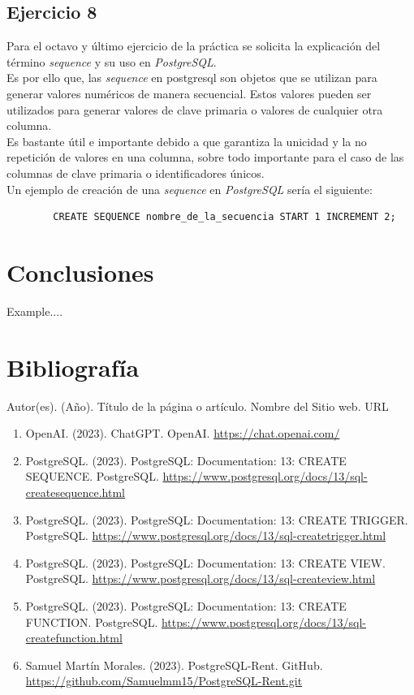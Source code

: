 \documentclass{report}
\begin{document}
	\section{Ejercicio 8}
	Para el octavo y último ejercicio de la práctica se solicita la explicación del término \emph{sequence} y su uso en \emph{PostgreSQL}.\\

	Es por ello que, las \emph{sequence} en postgresql son objetos que se utilizan para generar valores numéricos de manera secuencial. Estos valores pueden ser utilizados para generar valores de clave primaria o valores de cualquier otra columna.\\

	Es bastante útil e importante debido a que garantiza la unicidad y la no repetición de valores en una columna, sobre todo importante para el caso de las columnas de clave primaria o identificadores únicos.\\

	Un ejemplo de creación de una \emph{sequence} en \emph{PostgreSQL} sería el siguiente:

	\begin{verbatim}
		CREATE SEQUENCE nombre_de_la_secuencia START 1 INCREMENT 2;
	\end{verbatim}

	\chapter{Conclusiones}
  Example....	

	\chapter{Bibliografía}
	Autor(es). (Año). Título de la página o artículo. Nombre del Sitio web. URL\\
	\begin{enumerate}
		\item OpenAI. (2023). ChatGPT. OpenAI. \url{https://chat.openai.com/}
		\item PostgreSQL. (2023). PostgreSQL: Documentation: 13: CREATE SEQUENCE. PostgreSQL. \url{https://www.postgresql.org/docs/13/sql-createsequence.html}
		\item PostgreSQL. (2023). PostgreSQL: Documentation: 13: CREATE TRIGGER. PostgreSQL. \url{https://www.postgresql.org/docs/13/sql-createtrigger.html}
		\item PostgreSQL. (2023). PostgreSQL: Documentation: 13: CREATE VIEW. PostgreSQL. \url{https://www.postgresql.org/docs/13/sql-createview.html}
		\item PostgreSQL. (2023). PostgreSQL: Documentation: 13: CREATE FUNCTION. PostgreSQL. \url{https://www.postgresql.org/docs/13/sql-createfunction.html}
		\item Samuel Martín Morales. (2023). PostgreSQL-Rent. GitHub. \url{https://github.com/Samuelmm15/PostgreSQL-Rent.git}
	\end{enumerate}	
\end{document}
